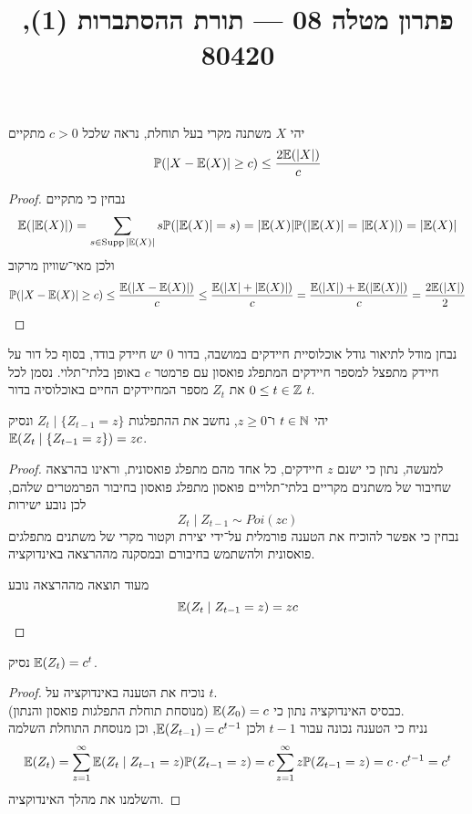 
\title{פתרון מטלה 08 --- תורת ההסתברות (1), 80420}

\DeclareMathOperator{\Supp}{Supp}


\maketitle
\maketitleprint{}

\question{}
יהי $X$ משתנה מקרי בעל תוחלת, נראה שלכל $c > 0$ מתקיים
\[
	\mathbb{P}(|X - \mathbb{E}(X)| \ge c)
	\le \frac{2 \mathbb{E}(|X|)}{c}
\]
\begin{proof}
	נבחין כי מתקיים
	\[
		\EE(|\EE(X)|)
		= \sum_{s \in \Supp |\EE(X)|} s \PP(|\EE(X)| = s)
		= |\EE(X)| \PP(|\EE(X)| = |\EE(X)|)
		= |\EE(X)|
	\]
	ולכן מאי־שוויון מרקוב
	\[
		\mathbb{P}(|X - \mathbb{E}(X)| \ge c)
		\le \frac{\mathbb{E}(|X - \mathbb{E}(X)|)}{c}
		\le \frac{\mathbb{E}(|X| + |\mathbb{E}(X)|)}{c}
		= \frac{\mathbb{E}(|X|) + \mathbb{E}(|\mathbb{E}(X)|)}{c}
		= \frac{2 \mathbb{E}(|X|)}{2}
	\]
\end{proof}

\question{}
נבחן מודל לתיאור גודל אוכלוסיית חיידקים במושבה,
בדור 0 יש חיידק בודד, בסוף כל דור על חיידק מתפצל למספר חיידקים המתפלג פואסון עם פרמטר $c$ באופן בלתי־תלוי.
נסמן לכל $0 \le t \in \mathbb{Z}$ את $Z_t$ מספר המחיידקים החיים באוכלוסיה בדור $t$.

\subquestion{}
יהי $t \in \mathbb{N}$ ו־$z \ge 0$, נחשב את ההתפלגות $Z_t \mid \{ Z_{t - 1} = z \}$ ונסיק $\mathbb{E}(Z_t \mid \{Z_{t - 1} = z\}) = z c$.
\begin{proof}
	למעשה, נתון כי ישנם $z$ חיידקים, כל אחד מהם מתפלג פואסונית, וראינו בהרצאה שחיבור של משתנים מקריים בלתי־תלויים פואסון מתפלג פואסון בחיבור הפרמטרים שלהם, לכן נובע ישירות
	\[
		Z_t \mid Z_{t - 1} \sim Poi(z c)
	\]
	נבחין כי אפשר להוכיח את הטענה פורמלית על־ידי יצירת וקטור מקרי של משתנים מתפלגים פואסונית ולהשתמש בחיבורם ובמסקנה מההרצאה באינדוקציה.

	מעוד תוצאה מההרצאה נובע
	\[
		\mathbb{E}(Z_t \mid Z_{t - 1} = z) = z c
	\]
\end{proof}

\subquestion{}
נסיק $\mathbb{E}(Z_t) = c^t$.
\begin{proof}
	נוכיח את הטענה באינדוקציה על $t$. \\
	כבסיס האינדוקציה נתון כי $\mathbb{E}(Z_0) = c$ (מנוסחת תוחלת התפלגות פואסון והנתון). \\
	נניח כי הטענה נכונה עבור $t - 1$ ולכן $\mathbb{E}(Z_{t - 1}) = c^{t - 1}$, וכן מנוסחת התוחלת השלמה
	\[
		\mathbb{E}(Z_t)
		= \sum_{z = 1}^{\infty} \mathbb{E}(Z_t \mid Z_{t - 1} = z) \mathbb{P}(Z_{t - 1} = z)
		= c \sum_{z = 1}^{\infty} z \mathbb{P}(Z_{t - 1} = z)
		= c \cdot c^{t - 1}
		= c^t
	\]
	והשלמנו את מהלך האינדוקציה.
\end{proof}

